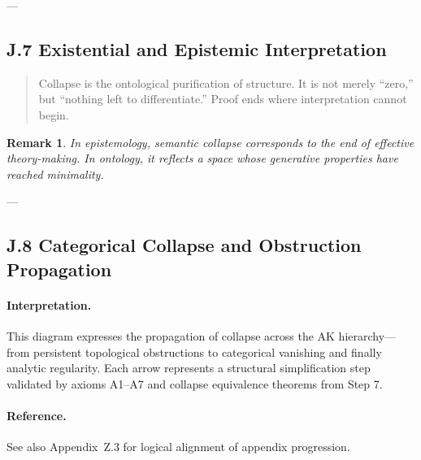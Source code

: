 \documentclass[11pt]{article}
\newtheorem{remark}[theorem]{Remark}
\begin{document}
\begin{axiom}
\begin{axiom}
---

\subsection*{J.7 Existential and Epistemic Interpretation}

\begin{quote}
Collapse is the ontological purification of structure.  
It is not merely “zero,” but “nothing left to differentiate.”  
Proof ends where interpretation cannot begin.
\end{quote}

\begin{remark}
In epistemology, semantic collapse corresponds to the end of effective theory-making.  
In ontology, it reflects a space whose generative properties have reached minimality.
\end{remark}

---

\subsection*{J.8 Categorical Collapse and Obstruction Propagation}

\begin{center}
\end{center}

\paragraph{Interpretation.}
This diagram expresses the propagation of collapse across the AK hierarchy—from persistent topological obstructions to categorical vanishing and finally analytic regularity.
Each arrow represents a structural simplification step validated by axioms A1–A7 and collapse equivalence theorems from Step 7.

\paragraph{Reference.}
See also Appendix~Z.3 for logical alignment of appendix progression.


\end{axiom}
\end{axiom}
\end{document}
